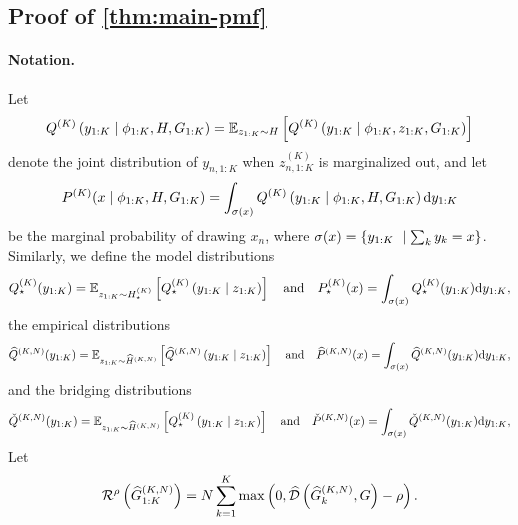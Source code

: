 
\subsection{Proof of \cref{thm:main-pmf}}

\paragraph{Notation.}
Let
\[
  Q^{(K)}\left({y}_{1:K}\mid{\phi}_{1:K},H,G_{1:K}\right)=
  \mathbb{E}_{z_{1:K}\sim H}\left[Q^{(K)}\left({y}_{1:K}\mid{\phi}_{1:K},z_{1:K},G_{1:K}\right)\right]
\]
denote the joint distribution of ${y}_{n,1:K}$ when $z^{(K)}_{n,1:K}$ is marginalized out, and let
\[
	P^{(K)}({x}\mid{\phi}_{1:K},H,G_{1:K})
  =\int_{\sigma({x})}Q^{(K)}\lrp{{y}_{1:K}\mid{\phi}_{1:K},H,G_{1:K}}\d{y}_{1:K}
\]
be the marginal probability of drawing ${x}_{n}$, where $\sigma({x})=\left\{{y}_{1:K}\ \mid \sum_{k}{y}_{k}={x}\right\}$.
Similarly, we define the model distributions
\[
	Q^{(K)}_{\star}({y}_{1:K})=
  \mathbb{E}_{z_{1:K}\sim H^{(K)}_{\star}}\lrb{Q^{(K)}_{\star}\lrp{{y}_{1:K}\mid z_{1:K}}} \quad\text{and}\quad
	P^{(K)}_{\star}({x})=
	\int_{\sigma({x})}Q^{(K)}_{\star}({y}_{1:K})\d{y}_{1:K},
\]
the empirical distributions
\[
	\widehat{Q}^{(K,N)}({y}_{1:K}) = \mathbb{E}_{z_{1:K}\sim\widehat{H}^{(K,N)}}\lrb{\widehat{Q}^{(K,N)}\lrp{{y}_{1:K}\mid z_{1:K}}}
    \quad\text{and}\quad
  \widehat{P}^{(K,N)}({x}) =
	\int_{\sigma({x})}\widehat{Q}^{(K,N)}({y}_{1:K})\d{y}_{1:K},
\]
and the bridging distributions
\[
	\check{Q}^{(K,N)}({y}_{1:K})=
\mathbb{E}_{z_{1:K}\sim\widehat{H}^{(K,N)}}\lrb{Q^{(K)}_{\star}\lrp{{y}_{1:K}\mid z_{1:K}}}
 \quad\text{and}\quad
  \check{P}^{(K,N)}({x})=
	\int_{\sigma({x})}\check{Q}^{(K,N)}({y}_{1:K})\d{y}_{1:K},
\]
Let
\[
	\mathcal{R}^{\rho}\left(\widehat{G}^{(K,N)}_{1:K}\right)
	=N\sum^{K}_{k=1}\mathop{\mathrm{max}}\left(0, \widehat{\mathcal{D}}\left(\widehat{G}^{(K,N)}_{k},G\right)-\rho\right).
\]

